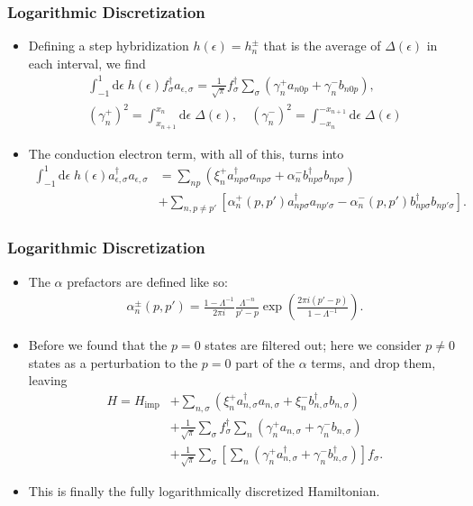 \documentclass{beamer}
\newcommand{\dd}{\mathrm{d}}
\begin{document}
\begin{frame}
  \frametitle{Logarithmic Discretization}

  \begin{itemize}
  \item Defining a step hybridization $h(\epsilon) = h^\pm_n$ that is the average of $\Delta(\epsilon)$ in each interval, we find
    \begin{gather}
      \int_{-1}^1 \dd\epsilon \; h(\epsilon)f^\dagger_\sigma a_{\epsilon,\sigma} = \frac{1}{\sqrt{\pi}}f^\dagger_\sigma \sum_\sigma (\gamma^+_n a_{n0p} + \gamma^-_n b_{n0p}), \\
      (\gamma^+_n)^2 = \int_{x_{n+1}}^{x_n} \dd\epsilon \; \Delta(\epsilon), \quad (\gamma^-_n)^2 = \int_{-x_n}^{-x_{n+1}} \dd\epsilon \; \Delta(\epsilon)
    \end{gather}
  \item The conduction electron term, with all of this, turns into
    \begin{align}
      \int_{-1}^1 \dd\epsilon \; h(\epsilon) a^\dagger_{\epsilon,\sigma} a_{\epsilon,\sigma} &= \sum_{np} (\xi^+_n a^\dagger_{np\sigma}a_{np\sigma} + \alpha^-_n b^\dagger_{np\sigma}b_{np\sigma}) \\
                                                                                             &+ \sum_{n,p \neq p'} \left[ \alpha^+_n(p,p')a^\dagger_{np\sigma}a_{np'\sigma} - \alpha^-_n(p,p')b^\dagger_{np\sigma}b_{np'\sigma} \right].
    \end{align}
  \end{itemize}
\end{frame}

\begin{frame}
  \frametitle{Logarithmic Discretization}

  \begin{itemize}
  \item The $\alpha$ prefactors are defined like so:
    \begin{gather*}
      \alpha^\pm_n(p,p') = \frac{1 - \Lambda^{-1}}{2 \pi i} \frac{\Lambda^{-n}}{p' - p}\exp\left( \frac{2\pi i(p'-p)}{1 - \Lambda^{-1}} \right).
    \end{gather*}
  \item Before we found that the $p=0$ states are filtered out; here we consider $p \neq 0$ states as a perturbation to the $p=0$ part of the $\alpha$ terms, and drop them, leaving
    \begin{align*}
      H = H_{\mathrm{imp}} &+ \sum_{n,\sigma}(\xi^+_n a^\dagger_{n,\sigma} a_{n,\sigma} + \xi^-_n b^\dagger_{n,\sigma} b_{n,\sigma}) \\
                           &+ \frac{1}{\sqrt{\pi}}\sum_\sigma f^\dagger_\sigma \sum_n (\gamma^+_n a_{n,\sigma} + \gamma^-_n b_{n,\sigma})\\
                           &+ \frac{1}{\sqrt{\pi}}\sum_\sigma \left[ \sum_n(\gamma^+_n a^\dagger_{n,\sigma} + \gamma^-_n b^\dagger_{n,\sigma}) \right] f_\sigma.
    \end{align*}
  \item This is finally the fully logarithmically discretized Hamiltonian.
  \end{itemize}
\end{frame}
\end{document}
